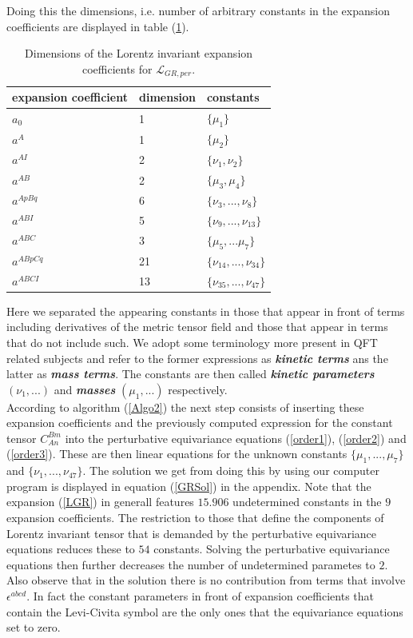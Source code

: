 \documentclass[a4paper,12pt, DIV=14, BCOR=5mm, twoside, headsepline, numbers=noenddot]{scrbook}
\begin{document}
Doing this the dimensions, i.e. number of arbitrary constants in the expansion coefficients are displayed in table (\ref{GRExp}).
\begin{table}
\centering 
\begin{tabular}{lll}\toprule
    expansion coefficient & dimension & constants   \\ \midrule
    $a_0$ & 1 & $\{\mu_1\}$ \\
    $a^A$ & 1 & $\{\mu_2\}$ \\
    $a^{AI}$ & 2 & $\{\nu_1, \nu_2\}$ \\
    $a^{AB}$ & 2 & $\{\mu_3, \mu_4 \} $ \\
    $a^{ApBq}$ & 6 & $\{\nu_3,...,\nu_8\}$ \\
    $a^{ABI}$ & 5 & $\{ \nu_9,...,\nu_{13} \}$ \\
    $a^{ABC}$ & 3 & $\{ \mu_5,...\mu_7 \}$\\
    $a^{ABpCq}$ & 21 & $\{\nu_{14},...,\nu_{34} \}$ \\
    $a^{ABCI}$ & 13 & $\{ \nu_{35},...,\nu_{47}\}$\\ \bottomrule
\end{tabular}
\caption{Dimensions of the Lorentz invariant expansion coefficients for $\mathcal{L}_{GR,per}$.}\label{GRExp}
\end{table}
Here we separated the appearing constants in those that appear in front of terms including derivatives of the metric tensor field and those that appear in terms that do not include such. We adopt some terminology more present in QFT related subjects and refer to the former expressions as \textbf{\textit{kinetic terms}} ans the latter as \textit{\textbf{mass terms}}. The constants are then called \textit{\textbf{kinetic parameters}} $(\nu_1,...)$ and \textit{\textbf{masses}} $(\mu_1,...)$ respectively.   \\

According to algorithm (\ref{Algo2}) the next step consists of inserting these expansion coefficients and the previously computed expression for the constant tensor $C_{An}^{Bm}$ into the perturbative equivariance equations (\ref{order1}), (\ref{order2}) and (\ref{order3}). These are then linear equations for the unknown constants $\{ \mu_1,...,\mu_7\}$ and $\{\nu_1,...,\nu_{47}\}$. The solution we get from doing this by using our computer program is displayed in equation (\ref{GRSol}) in the appendix. Note that the expansion (\ref{LGR}) in generall features $15.906$ undetermined constants in the $9$ expansion coefficients. The restriction to those that define the components of Lorentz invariant tensor that is demanded by the perturbative equivariance equations reduces these to $54$ constants. Solving the perturbative equivariance equations then further decreases the number of undetermined parametes to $2$. Also observe that in the solution there is no contribution from terms that involve $\epsilon^{abcd}$. In fact the constant parameters in front of expansion coefficients that contain the Levi-Civita symbol are the only ones that the equivariance equations set to zero. \\
\end{document}
